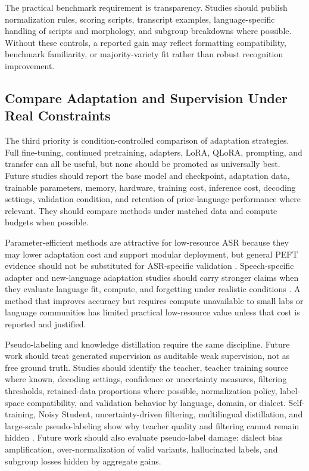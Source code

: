 \documentclass[pdflatex,sn-basic,iicol]{sn-jnl}
\theoremstyle{thmstyleone}
\theoremstyle{thmstyletwo}
\theoremstyle{thmstylethree}
\begin{document}
The practical benchmark requirement is transparency. Studies should publish normalization rules, scoring scripts, transcript examples, language-specific handling of scripts and morphology, and subgroup breakdowns where possible. Without these controls, a reported gain may reflect formatting compatibility, benchmark familiarity, or majority-variety fit rather than robust recognition improvement.

\subsection{Compare Adaptation and Supervision Under Real Constraints}

The third priority is condition-controlled comparison of adaptation strategies. Full fine-tuning, continued pretraining, adapters, LoRA, QLoRA, prompting, and transfer can all be useful, but none should be promoted as universally best. Future studies should report the base model and checkpoint, adaptation data, trainable parameters, memory, hardware, training cost, inference cost, decoding settings, validation condition, and retention of prior-language performance where relevant. They should compare methods under matched data and compute budgets when possible.

Parameter-efficient methods are attractive for low-resource ASR because they may lower adaptation cost and support modular deployment, but general PEFT evidence should not be substituted for ASR-specific validation \citep{pmlr-v97-houlsby19a,hu2022lora,dettmers2023qlora}. Speech-specific adapter and new-language adaptation studies should carry stronger claims when they evaluate language fit, compute, and forgetting under realistic conditions \citep{udupa24_interspeech,qian24_interspeech}. A method that improves accuracy but requires compute unavailable to small labs or language communities has limited practical low-resource value unless that cost is reported and justified.

Pseudo-labeling and knowledge distillation require the same discipline. Future work should treat generated supervision as auditable weak supervision, not as free ground truth. Studies should identify the teacher, teacher training source where known, decoding settings, confidence or uncertainty measures, filtering thresholds, retained-data proportions where possible, normalization policy, label-space compatibility, and validation behavior by language, domain, or dialect. Self-training, Noisy Student, uncertainty-driven filtering, multilingual distillation, and large-scale pseudo-labeling show why teacher quality and filtering cannot remain hidden \citep{park20d_interspeech,khurana2020dust,leal21_interspeech,bhogale24_interspeech}. Future work should also evaluate pseudo-label damage: dialect bias amplification, over-normalization of valid variants, hallucinated labels, and subgroup losses hidden by aggregate gains.
\end{document}
